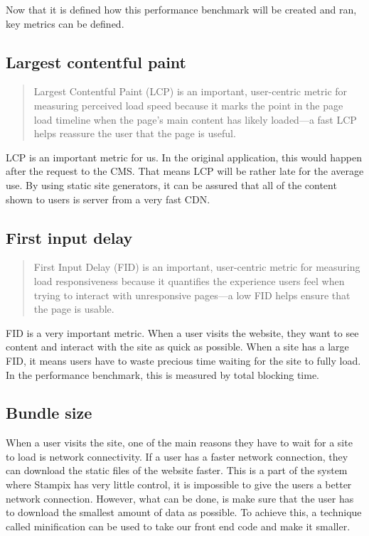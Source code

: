 Now that it is defined how this performance benchmark will be created and ran, key metrics can be defined.

\subsection{Largest contentful paint}

\begin{quote}
	Largest Contentful Paint (LCP) is an important, user-centric metric for measuring perceived load speed because it marks the point in the page load timeline when the page's main content has likely loaded—a fast LCP helps reassure the user that the page is useful.
	\hfill \cite{webvitalswebsite}
\end{quote}

LCP is an important metric for us. In the original application, this would happen after the request to the CMS. 
That means LCP will be rather late for the average use.
By using static site generators, it can be assured that all of the content shown to users is server from a very fast CDN. 

\subsection{First input delay}

\begin{quote}
	First Input Delay (FID) is an important, user-centric metric for measuring load responsiveness because it quantifies the experience users feel when trying to interact with unresponsive pages—a low FID helps ensure that the page is usable.
	\hfill \cite{webvitalswebsite}
\end{quote}

FID is a very important metric. When a user visits the website, they want to see content and interact with the site as quick as possible. 
When a site has a large FID, it means users have to waste precious time waiting for the site to fully load. In the performance benchmark, this is measured by total blocking time. 

\subsection{Bundle size}

When a user visits the site, one of the main reasons they have to wait for a site to load is network connectivity. 
If a user has a faster network connection, they can download the static files of the website faster.
This is a part of the system where Stampix has very little control, it is impossible to give the users a better network connection. 
However, what can be done, is make sure that the user has to download the smallest amount of data as possible. 
To achieve this, a technique called minification can be used to take our front end code and make it smaller.

